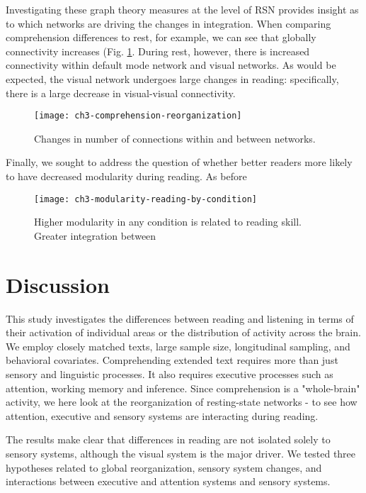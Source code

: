 Investigating these graph theory measures at the level of RSN provides  insight as to which networks are driving the changes in integration. When comparing comprehension differences to rest, for example, we can see that globally connectivity increases (Fig. \ref{fig:ch3-comprehension-reorganization}. During rest, however, there is increased connectivity within default mode network and visual networks. As would be expected, the visual network undergoes large changes in reading: specifically, there is a large decrease in visual-visual connectivity. 

\begin{figure}[t]
	\centering
	\texttt{[image: ch3-comprehension-reorganization]}
    \caption[Changes in number of connections within and between networks.]{Changes in number of connections within and between networks.}
	\label{fig:ch3-comprehension-reorganization}
\end{figure}

Finally, we sought to address the question of whether better readers more likely to have decreased modularity during reading. As before 

\begin{figure}[t]
	\centering
	\texttt{[image: ch3-modularity-reading-by-condition]}
    \caption[Higher modularity in any condition is related to reading skill.]{Higher modularity in any condition is related to reading skill. Greater integration between}
	\label{fig:ch3-modularity-reading-by-condition}
\end{figure}


\section{Discussion}

This study investigates the differences between reading and listening in terms of their activation of individual areas or the distribution of activity across the brain. We employ closely matched texts, large sample size, longitudinal sampling, and behavioral covariates. Comprehending extended text requires more than just sensory and linguistic processes. It also requires executive processes such as attention, working memory and inference. Since comprehension is a "whole-brain" activity, we here look at the reorganization of resting-state networks - to see how attention, executive and sensory systems are interacting during reading.

The results make clear that differences in reading are not isolated solely to sensory systems, although the visual system is the major driver. We tested three hypotheses related to global reorganization, sensory system changes, and interactions between executive and attention systems and sensory systems.

